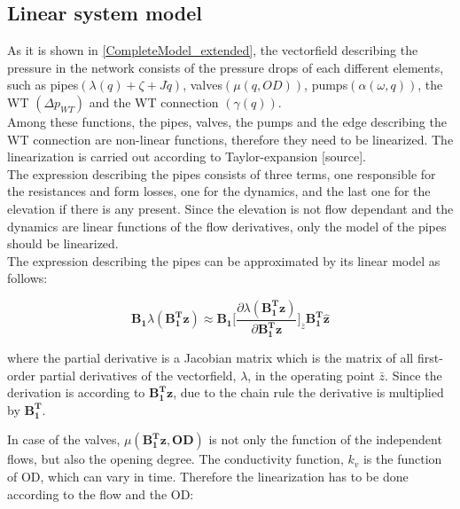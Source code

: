 %
%
%
%

\subsection{Linear system model}
 \label{SystemLin}
 
As it is shown in \eqref{CompleteModel_extended}, the vectorfield describing the pressure in the network consists of the pressure drops of each different elements, such as pipes$(\lambda(q) + \zeta + J \dot{q})$, valves$(\mu(q,OD))$, pumps$(\alpha(\omega, q))$, the WT $(\Delta p_{WT})$ and the WT connection $(\gamma(q))$.
\\
Among these functions, the pipes, valves, the pumps and the edge describing the WT connection are non-linear functions, therefore they need to be linearized. The linearization is carried out according to Taylor-expansion [source].
\\
The expression describing the pipes consists of three terms, one responsible for the resistances and form losses, one for the dynamics, and the last one for the elevation if there is any present. Since the elevation is not flow dependant and the dynamics are linear functions of the flow derivatives, only the model of the pipes should be linearized. 
\\
The expression describing the pipes can be approximated by its linear model as follows:

\begin{equation}
  \pmb{B_1} \lambda(\pmb{{B_1^{T}}}\pmb{z}) \approx \pmb{B_1} \bigg[ \frac{\partial{\lambda(\pmb{{B_1^{T}}}\pmb{z})}}{{\partial{\pmb{{B_1^{T}}}\pmb{z}}}}   \bigg]_{\bar{z}} \pmb{{B_1^{T}}}\pmb{\hat{z}}
\label{lambda_lin}
\end{equation}

where the partial derivative is a Jacobian matrix which is the matrix of all first-order partial derivatives of the vectorfield, $\lambda$, in the operating point $\bar{z}$. Since the derivation is according to $\pmb{{B_1^{T}}}\pmb{z}$, due to the chain rule the derivative is multiplied by $\pmb{{B_1^{T}}}$. 


In case of the valves, $\mu(\pmb{{B_1^{T}}}\pmb{z}, \pmb{OD})$ is not only the function of the independent flows, but also the opening degree. The conductivity function, $k_v$ is the function of OD, which can vary in time. Therefore the linearization has to be done according to the flow and the OD: 

